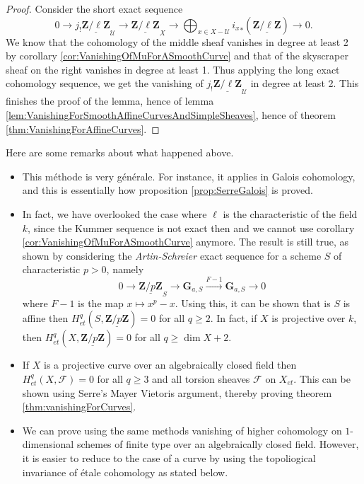 \begin{proof}
Consider the short exact sequence
$$
0 \longrightarrow j_!\underline{\mathbf{Z}/\ell\mathbf{Z}}_\mathcal{U} 
\longrightarrow \underline{\mathbf{Z}/\ell\mathbf{Z}}_X \longrightarrow 
\bigoplus_{x \in X-\mathcal{U}} {i_x}_*(\underline{\mathbf{Z}/\ell\mathbf{Z}}) 
\longrightarrow 0.
$$
We know that the cohomology of the middle sheaf vanishes in degree at least 2 
by corollary \ref{cor:VanishingOfMuForASmoothCurve} and that of the skyscraper 
sheaf on the right vanishes in degree at least 1. Thus applying the long exact 
cohomology sequence, we get the vanishing of 
$j_!\underline{\mathbf{Z}/\ell\mathbf{Z}}_\mathcal{U}$ in degree at least 2. 
This finishes the proof of the lemma, hence of lemma 
\ref{lem:VanishingForSmoothAffineCurvesAndSimpleSheaves}, hence of theorem 
\ref{thm:VanishingForAffineCurves}.
\end{proof}


\begin{remark}
Here are some remarks about what happened above.
\begin{itemize}
\item 
This m\'ethode is very g\'en\'erale. For instance, it applies in Galois 
cohomology, and this is essentially how proposition \ref{prop:SerreGalois} is 
proved.
\item
In fact, we have overlooked the case where $\ell$ is the characteristic of the 
field $k$, since the Kummer sequence is not exact then and we cannot use 
corollary \ref{cor:VanishingOfMuForASmoothCurve} anymore. The result is still 
true, as shown by considering the \emph{Artin-Schreier} exact sequence for a 
scheme $S$ of characteristic $p >0$, namely
$$
0 \longrightarrow \underline{\mathbf{Z}/p\mathbf{Z}}_S \longrightarrow 
\mathbf{G}_{a,S} \xrightarrow{F-1} \mathbf{G}_{a,S} \longrightarrow 0
$$
where $F-1$ is the map $x \mapsto x^p - x$. Using this, it can be shown that is 
$S$ is affine then $H_{et}^q(S,\underline{\mathbf{Z}/p\mathbf{Z}}) = 0$ for all 
$q \geq 2$. In fact, if $X$ is projective over $k$, then 
$H_{et}^q(X,\underline{\mathbf{Z}/p\mathbf{Z}}) = 0$ for all $q \geq \dim X+2$.
\item
If $X$ is a projective curve over an algebraically closed field then 
$H_{et}^q(X,\mathcal{F}) = 0$ for all $q \geq 3$ and all torsion sheaves 
$\mathcal{F}$ on $X_{et}$. This can be shown using Serre's Mayer Vietoris 
argument, thereby proving theorem \ref{thm:vanishingForCurves}.
\item We can prove using the same methods vanishing of higher cohomology
on $1$-dimensional schemes of finite type over an algebraically closed field.
However, it is easier to reduce to the case of a curve by using the
topoliogical invariance of \'etale cohomology as stated below.
\end{itemize}
\end{remark}

